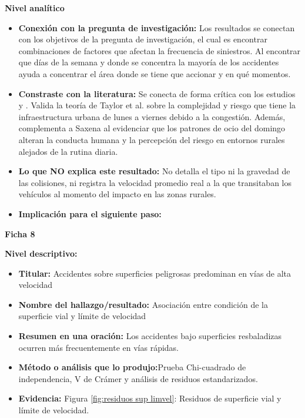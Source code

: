 \documentclass[12pt]{article}
\begin{document}
\textbf{Nivel analítico}

\begin{itemize}
    \item \textbf{Conexión con la pregunta de investigación:} Los resultados se conectan con los objetivos de la 
    pregunta de investigación, el cual es encontrar combinaciones de factores que afectan la frecuencia de siniestros.
    Al encontrar que días de la semana y donde se concentra la mayoría de los accidentes ayuda a concentrar 
    el área donde se tiene que accionar y en qué momentos.
    
	\item \textbf{Constraste con la literatura:} Se conecta de forma crítica 
    con los estudios \textcite{TAYLOR2000} y \textcite{SAXENA2017}. Valida la teoría de Taylor et al. sobre la complejidad y riesgo que tiene la infraestructura urbana de lunes 
	a viernes debido a la congestión. Además, complementa a Saxena al evidenciar que los patrones de ocio del domingo alteran la
	conducta humana y la percepción del riesgo en entornos rurales alejados de la rutina diaria.
    	
	\item \textbf{Lo que NO explica este resultado:}   No detalla el tipo ni la gravedad de las colisiones, 
	ni registra la velocidad promedio real a la que transitaban los vehículos al momento del impacto en las zonas rurales.
    
	\item \textbf{Implicación para el siguiente paso:} \\
\end{itemize}


\textbf{Ficha 8}

\textbf{Nivel descriptivo:}
\begin{itemize}
    \item \textbf{Titular:} Accidentes sobre superficies peligrosas predominan en vías de alta velocidad
    \item \textbf{Nombre del hallazgo/resultado:} Asociación entre condición de la superficie vial y límite de velocidad
    \item \textbf{Resumen en una oración:} Los accidentes bajo superficies resbaladizas ocurren más frecuentemente en vías rápidas.
    \item \textbf{Método o análisis que lo produjo:}Prueba Chi-cuadrado de independencia, V de Crámer y análisis de residuos estandarizados.
    \item \textbf{Evidencia:} Figura \ref{fig:residuos sup limvel}: Residuos 
    de superficie vial y límite de velocidad. \\
\end{itemize}
\end{document}
